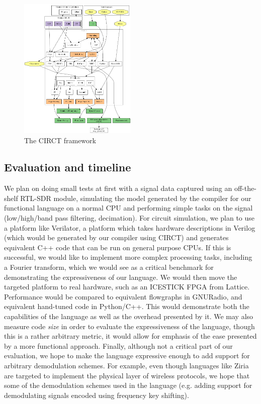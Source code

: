 \documentclass{article}
\begin{document}
\begin{figure}
\begin{center}

\includegraphics[width=0.5\textwidth]{circt.png}
\end{center}

\caption{The CIRCT framework}
\end{figure}

\subsection{Evaluation and timeline} %
We plan on doing small tests at first with a signal data captured using an off-the-shelf RTL-SDR module, simulating the model generated by the compiler for our functional language on a normal CPU and performing simple tasks on the signal (low/high/band pass filtering, decimation). For circuit simulation, we plan to use a platform like Verilator, a platform which takes hardware descriptions in Verilog (which would be generated by our compiler using CIRCT) and generates equivalent C++ code that can be run on general purpose CPUs. If this is successful, we would like to implement more complex processing tasks, including a Fourier transform, which we would see as a critical benchmark for demonstrating the expressiveness of our language. 
We would then move the targeted platform to real hardware, such as an ICESTICK FPGA from Lattice. Performance would be compared to equivalent flowgraphs in GNURadio, and equivalent hand-tuned code in Python/C++. This would demonstrate both the capabilities of the language as well as the overhead presented by it. We may also measure code \textit{size} in order to evaluate the expressiveness of the language, though this is a rather arbitrary metric, it would allow for emphasis of the ease presented by a more functional approach. 
Finally, although not a critical part of our evaluation, we hope to make the language expressive enough to add support for arbitrary demodulation schemes. For example, even though languages like Ziria are targeted to implement the physical layer of wireless protocols, we hope that some of the demodulation schemes used in the language (e.g. adding support for demodulating signals encoded using frequency key shifting). 
\end{document}
